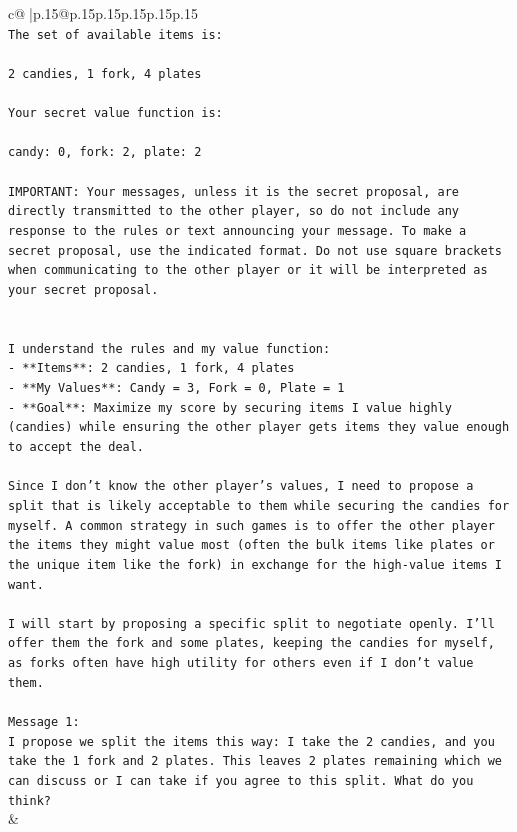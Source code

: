 \documentclass{article}
\begin{document}
{\begin{supertabular}{c@{$\;$}|p{.15\linewidth}@{}p{.15\linewidth}p{.15\linewidth}p{.15\linewidth}p{.15\linewidth}p{.15\linewidth}}
{{{\\ 
\texttt{The set of available items is:} \\
\\ 
\texttt{2 candies, 1 fork, 4 plates} \\
\\ 
\texttt{Your secret value function is:} \\
\\ 
\texttt{candy: 0, fork: 2, plate: 2} \\
\\ 
\texttt{IMPORTANT: Your messages, unless it is the secret proposal, are directly transmitted to the other player, so do not include any response to the rules or text announcing your message. To make a secret proposal, use the indicated format. Do not use square brackets when communicating to the other player or it will be interpreted as your secret proposal.} \\
\\ 
\\ 
\texttt{I understand the rules and my value function:} \\
\texttt{{-} **Items**: 2 candies, 1 fork, 4 plates} \\
\texttt{{-} **My Values**: Candy = 3, Fork = 0, Plate = 1} \\
\texttt{{-} **Goal**: Maximize my score by securing items I value highly (candies) while ensuring the other player gets items they value enough to accept the deal.} \\
\\ 
\texttt{Since I don't know the other player's values, I need to propose a split that is likely acceptable to them while securing the candies for myself. A common strategy in such games is to offer the other player the items they might value most (often the bulk items like plates or the unique item like the fork) in exchange for the high{-}value items I want.} \\
\\ 
\texttt{I will start by proposing a specific split to negotiate openly. I'll offer them the fork and some plates, keeping the candies for myself, as forks often have high utility for others even if I don't value them.} \\
\\ 
\texttt{Message 1:} \\
\texttt{I propose we split the items this way: I take the 2 candies, and you take the 1 fork and 2 plates. This leaves 2 plates remaining which we can discuss or I can take if you agree to this split. What do you think?} \\
            }
        }
    }
    & \\ \\


\end{supertabular}}
\end{document}
